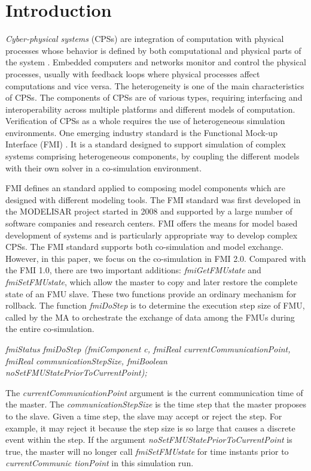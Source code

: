 \section{Introduction}

\textit{Cyber-physical systems} (CPSs)  are integration of computation with physical processes whose behavior is defined by both computational and physical parts of the system \cite{Zanero17}. Embedded computers and networks monitor and control the physical processes, usually with feedback loops where physical processes affect computations and vice versa. The heterogeneity is one of the main characteristics of CPSs. The components of CPSs are of various types, requiring interfacing and interoperability across multiple platforms and different models of computation. Verification of CPSs as a whole requires the use of heterogeneous simulation environments. One emerging industry
standard is the Functional Mock-up Interface (FMI) \cite{Blochwitz2011The}. It
is a standard designed to support simulation of complex systems
comprising heterogeneous components, by coupling the different models with their own solver in a co-simulation environment.

FMI \cite{BromanBGLMTW13} defines an standard applied to composing model components which are designed with different modeling tools. The FMI standard was first developed in the MODELISAR project started in 2008 and supported by a large number of software companies and research centers. FMI offers the means for model based development of systems and is particularly appropriate way to develop complex CPSs. The FMI standard supports both co-simulation and  model exchange. However, in this paper, we focus on the co-simulation in FMI 2.0.
Compared with the FMI 1.0, there are two important additions: \emph{fmiGetFMUstate} and \emph{fmiSetFMUstate}, which allow the master to copy and later restore the complete state of an FMU slave. These two functions provide an ordinary mechanism for rollback. The function \emph{fmiDoStep} is to determine the execution step size of FMU, called by the MA to orchestrate the exchange of data among the FMUs during the entire co-simulation. 

\emph{fmiStatus fmiDoStep (fmiComponent c, fmiReal currentCommunicationPoint, fmiReal communicationStepSize, fmiBoolean noSetFMUStatePriorToCurrentPoint);}

The \emph{currentCommunicationPoint} argument is the current communication time of the master. The \emph{communicationStepSize} is the time step that the master proposes to the slave. Given a time step, the slave may accept or reject the step. For example, it may reject it because the step size is so large that causes a discrete event within the step. If the argument \emph{noSetFMUStatePriorToCurrentPoint} is true, the master will no longer call \emph{fmiSetFMUstate} for time instants prior to \emph{currentCommunic tionPoint} in this simulation run. 

